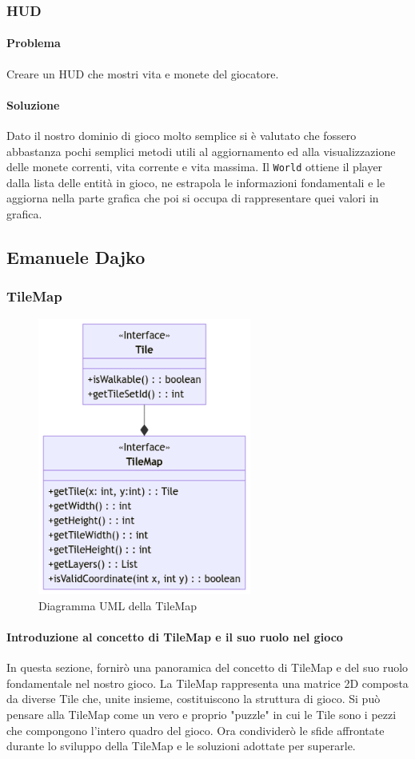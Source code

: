 \documentclass[a4paper,12pt]{report}
\begin{document}
\subsubsection{HUD}

\paragraph{Problema}
Creare un HUD che mostri vita e monete del giocatore.
\paragraph{Soluzione}
Dato il nostro dominio di gioco molto semplice si è valutato 
che fossero abbastanza pochi semplici metodi utili al aggiornamento 
ed alla visualizzazione delle monete correnti, vita corrente e vita massima.
Il \texttt{World} ottiene il player dalla lista delle entità in gioco, 
ne estrapola le informazioni fondamentali e le aggiorna nella parte grafica 
che poi si occupa di rappresentare quei valori in grafica.

\subsection{Emanuele Dajko}
\subsubsection{TileMap}
\begin{figure}[h]
	\centering
	\includegraphics[width=7cm]{uml/TileMap.png}
	\caption{Diagramma UML della TileMap}
\end{figure}

\paragraph*{Introduzione al concetto di TileMap e il suo ruolo nel gioco}
In questa sezione, fornirò una panoramica del concetto di TileMap e del suo ruolo fondamentale nel nostro gioco.
La TileMap rappresenta una matrice 2D composta da diverse Tile che, unite insieme, costituiscono la struttura di gioco. 
Si può pensare alla TileMap come un vero e proprio "puzzle" in cui le Tile sono i pezzi che compongono l'intero quadro del gioco. 
Ora condividerò le sfide affrontate durante lo sviluppo della TileMap e le soluzioni adottate per superarle.
\end{document}
